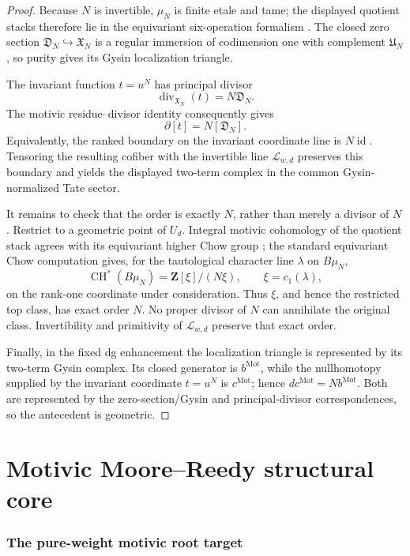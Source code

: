 \documentclass[11pt]{article}
\theoremstyle{remark}
\newcommand{\Z}{\mathbf Z}
\newcommand{\Mot}{\mathrm{Mot}}
\providecommand{\CH}{\operatorname{CH}}
\begin{document}
\begin{proof}
Because \(N\) is invertible, \(\mu_N\) is finite etale and tame; the displayed
quotient stacks therefore lie in the equivariant six-operation formalism
\cite{HoyoisEquivariantSix,KhanRaviStacks}.  The closed zero section
\(\mathfrak D_N\hookrightarrow\mathfrak X_N\) is a regular immersion of
codimension one with complement \(\mathfrak U_N\), so purity gives its Gysin
localization triangle.

The invariant function \(t=u^N\) has principal divisor
\[
 \operatorname{div}_{\mathfrak X_N}(t)=N\mathfrak D_N.
\]
The motivic residue--divisor identity consequently gives
\[
 \partial[t]=N[\mathfrak D_N].
\]
Equivalently, the ranked boundary on the invariant coordinate line is
\(N\operatorname{id}\).  Tensoring the resulting cofiber with the invertible
line \(\mathcal L_{w,d}\) preserves this boundary and yields the displayed
two-term complex in the common Gysin-normalized Tate sector.

It remains to check that the order is exactly \(N\), rather than merely a
divisor of \(N\).  Restrict to a geometric point of \(U_d\).  Integral motivic
cohomology of the quotient stack agrees with its equivariant higher Chow group
\cite{ChoudhuryDeshmukhHogadi}; the standard equivariant Chow computation
\cite{TotaroChowBG} gives, for the tautological character line
\(\lambda\) on \(B\mu_N\),
\[
 \CH^*(B\mu_N)=\Z[\xi]/(N\xi),\qquad \xi=c_1(\lambda),
\]
on the rank-one coordinate under consideration.  Thus \(\xi\), and hence the
restricted top class, has exact order \(N\).  No proper divisor of \(N\) can
annihilate the original class.  Invertibility and primitivity of
\(\mathcal L_{w,d}\) preserve that exact order.

Finally, in the fixed dg enhancement the localization triangle is represented
by its two-term Gysin complex.  Its closed generator is \(b^{\Mot}\), while the
nullhomotopy supplied by the invariant coordinate \(t=u^N\) is
\(c^{\Mot}\); hence \(dc^{\Mot}=Nb^{\Mot}\).  Both are represented by the
zero-section/Gysin and principal-divisor correspondences, so the antecedent is
geometric.
\end{proof}
\part{Motivic Moore--Reedy structural core}
\section{The pure-weight motivic root target}
\label{P2M-sec:v32-motivic-root-target}
\end{document}
